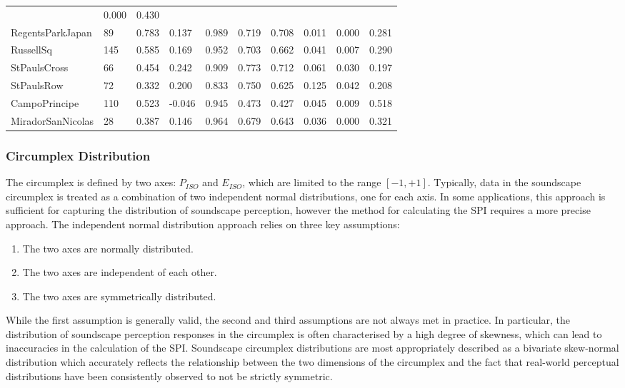 \documentclass[
  authoryear,
  preprint,
  3p]{elsarticle}
\providecommand{\tightlist}{%
  \setlength{\itemsep}{0pt}\setlength{\parskip}{0pt}}\usepackage{longtable,booktabs,array}
\begin{document}
\begin{longtable}[]{@{}llllllllll@{}}
& 0.000 & 0.430 \\
RegentsParkJapan & 89 & 0.783 & 0.137 & 0.989 & 0.719 & 0.708 & 0.011 &
0.000 & 0.281 \\
RussellSq & 145 & 0.585 & 0.169 & 0.952 & 0.703 & 0.662 & 0.041 & 0.007
& 0.290 \\
StPaulsCross & 66 & 0.454 & 0.242 & 0.909 & 0.773 & 0.712 & 0.061 &
0.030 & 0.197 \\
StPaulsRow & 72 & 0.332 & 0.200 & 0.833 & 0.750 & 0.625 & 0.125 & 0.042
& 0.208 \\
CampoPrincipe & 110 & 0.523 & -0.046 & 0.945 & 0.473 & 0.427 & 0.045 &
0.009 & 0.518 \\
MiradorSanNicolas & 28 & 0.387 & 0.146 & 0.964 & 0.679 & 0.643 & 0.036 &
0.000 & 0.321 \\
\end{longtable}

\subsubsection{Circumplex
Distribution}\label{sec-circumplex-distribution}

The circumplex is defined by two axes: \(P_{ISO}\) and \(E_{ISO}\),
which are limited to the range \([-1, +1]\). Typically, data in the
soundscape circumplex is treated as a combination of two independent
normal distributions, one for each axis. In some applications, this
approach is sufficient for capturing the distribution of soundscape
perception, however the method for calculating the SPI requires a more
precise approach. The independent normal distribution approach relies on
three key assumptions:

\begin{enumerate}
\def\labelenumi{\arabic{enumi}.}
\tightlist
\item
  The two axes are normally distributed.
\item
  The two axes are independent of each other.
\item
  The two axes are symmetrically distributed.
\end{enumerate}

While the first assumption is generally valid, the second and third
assumptions are not always met in practice. In particular, the
distribution of soundscape perception responses in the circumplex is
often characterised by a high degree of skewness, which can lead to
inaccuracies in the calculation of the SPI. Soundscape circumplex
distributions are most appropriately described as a bivariate
skew-normal distribution \citet{Azzalini2005} which accurately reflects
the relationship between the two dimensions of the circumplex and the
fact that real-world perceptual distributions have been consistently
observed to not be strictly symmetric.
\end{document}
